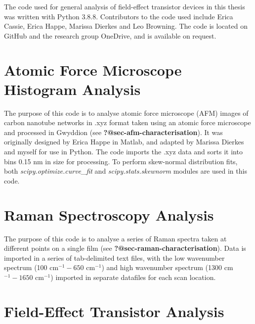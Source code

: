 \documentclass[
  a4paper,
]{scrbook}
\begin{document}
The code used for general analysis of field-effect transistor devices in
this thesis was written with Python 3.8.8. Contributors to the code used
include Erica Cassie, Erica Happe, Marissa Dierkes and Leo Browning. The
code is located on GitHub and the research group OneDrive, and is
available on request.

\hypertarget{sec-histogram-analysis}{%
\section{Atomic Force Microscope Histogram
Analysis}\label{sec-histogram-analysis}}

The purpose of this code is to analyse atomic force microscope (AFM)
images of carbon nanotube networks in .xyz format taken using an atomic
force microscope and processed in Gwyddion (see
\textbf{?@sec-afm-characterisation}). It was originally designed by
Erica Happe in Matlab, and adapted by Marissa Dierkes and myself for use
in Python. The code imports the .xyz data and sorts it into bins 0.15 nm
in size for processing. To perform skew-normal distribution fits, both
\emph{scipy.optimize.curve\_fit} and \emph{scipy.stats.skewnorm} modules
are used in this code.

\hypertarget{sec-raman-analysis}{%
\section{Raman Spectroscopy Analysis}\label{sec-raman-analysis}}

The purpose of this code is to analyse a series of Raman spectra taken
at different points on a single film (see
\textbf{?@sec-raman-characterisation}). Data is imported in a series of
tab-delimited text files, with the low wavenumber spectrum (100
cm\(^{-1} - 650\) cm\(^{-1}\)) and high wavenumber spectrum (1300
cm\(^{-1} - 1650\) cm\(^{-1}\)) imported in separate datafiles for each
scan location.

\hypertarget{sec-field-effect-transistor-analysis}{%
\section{Field-Effect Transistor
Analysis}\label{sec-field-effect-transistor-analysis}}
\end{document}
